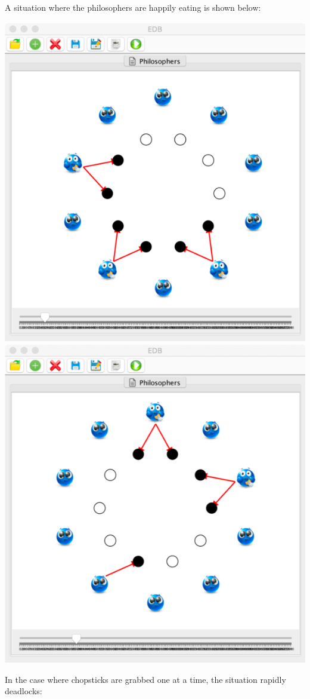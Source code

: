 \documentclass[5p,times]{elsarticle}
\begin{document}
A situation where the philosophers are happily eating is shown below:
\begin{center}
\includegraphics[width=0.49\columnwidth]{dining1}
\hfill
\includegraphics[width=0.49\columnwidth]{dining2}
\end{center}
In the case where chopsticks are grabbed one at a time, the situation rapidly deadlocks:
\end{document}
